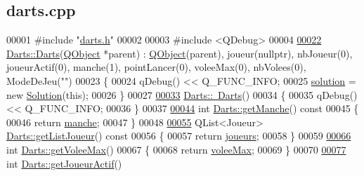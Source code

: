 \hypertarget{darts_8cpp_source}{}\subsection{darts.\+cpp}

\begin{DoxyCode}
00001 \textcolor{preprocessor}{ #include "\hyperlink{darts_8h}{darts.h}"}
00002 
00003 \textcolor{preprocessor}{#include <QDebug>}
00004 
\hyperlink{class_darts_aaa3365c94f97e58a61a05082d0d324d7}{00022} \hyperlink{class_darts_aaa3365c94f97e58a61a05082d0d324d7}{Darts::Darts}(\hyperlink{class_q_object}{QObject} *parent) : \hyperlink{class_q_object}{QObject}(parent), joueur(nullptr), nbJoueur(0), 
      joueurActif(0), manche(1), pointLancer(0), voleeMax(0), nbVolees(0), ModeDeJeu(\textcolor{stringliteral}{""})
00023 \{
00024     qDebug() << Q\_FUNC\_INFO;
00025     \hyperlink{class_darts_a40733010dc6ae4ce93140804b4d191ea}{solution} = \textcolor{keyword}{new} \hyperlink{class_solution}{Solution}(\textcolor{keyword}{this});
00026 \}
00027 
\hyperlink{class_darts_a335882c9fccd527d5c33a509269e0997}{00033} \hyperlink{class_darts_a335882c9fccd527d5c33a509269e0997}{Darts::~Darts}()
00034 \{
00035     qDebug() << Q\_FUNC\_INFO;
00036 \}
00037 
\hyperlink{class_darts_a2ce03c887d90f3a997648981d342b50c}{00044} \textcolor{keywordtype}{int} \hyperlink{class_darts_a2ce03c887d90f3a997648981d342b50c}{Darts::getManche}()\textcolor{keyword}{ const}
00045 \textcolor{keyword}{}\{
00046     \textcolor{keywordflow}{return} \hyperlink{class_darts_ac7b7bd23e64b4fab3895f02f085ea85f}{manche};
00047 \}
00048 
\hyperlink{class_darts_a0525b09703d3461bf5570197354743c3}{00055} QList<Joueur> \hyperlink{class_darts_a0525b09703d3461bf5570197354743c3}{Darts::getListJoueur}()\textcolor{keyword}{ const}
00056 \textcolor{keyword}{}\{
00057     \textcolor{keywordflow}{return} \hyperlink{class_darts_a81bc116f3ae70cea1f492f87f01901c7}{joueurs};
00058 \}
00059 
\hyperlink{class_darts_af2ca14bafbcdabe87fc306cc2e1d390e}{00066} \textcolor{keywordtype}{int} \hyperlink{class_darts_af2ca14bafbcdabe87fc306cc2e1d390e}{Darts::getVoleeMax}()
00067 \{
00068     \textcolor{keywordflow}{return} \hyperlink{class_darts_aed9c6aa8f34fb2dcbc57a5ea24aa6c2a}{voleeMax};
00069 \}
00070 
\hyperlink{class_darts_a20ddfd28c8355c06a90cc23abff3de11}{00077} \textcolor{keywordtype}{int} \hyperlink{class_darts_a20ddfd28c8355c06a90cc23abff3de11}{Darts::getJoueurActif}()

\end{DoxyCode}
